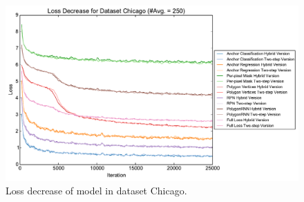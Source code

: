 \begin{figure}[!h]
	\centering
	\includegraphics[width=\fig\textwidth]{4-06.pdf}
    \caption[Loss decrease of model in dataset Chicago]{Loss decrease of model in dataset Chicago.}
	\label{fig:losdecch}
\end{figure}